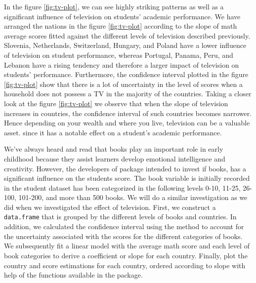 In the figure \ref{fig:tv-plot}, we can see highly striking patterns as
well as a significant influence of television on students' academic
performance. We have arranged the nations in the figure
\ref{fig:tv-plot} according to the slope of math average scores fitted
against the different levels of television described previously.
Slovenia, Netherlands, Switzerland, Hungary, and Poland have a lower
influence of television on student performance, whereas Portugal,
Panama, Peru, and Lebanon have a rising tendency and therefore a larger
impact of television on students' performance. Furthermore, the
confidence interval plotted in the figure \ref{fig:tv-plot} show that
there is a lot of uncertainty in the level of scores when a household
does not possess a TV in the majority of the countries. Taking a closer
look at the figure \ref{fig:tv-plot} we observe that when the slope of
television increases in countries, the confidence interval of such
countries becomes narrower. Hence depending on your wealth and where you
live, television can be a valuable asset. since it has a notable effect
on a student's academic performance.

We've always heard and read that books play an important role in early
childhood because they assist learners develop emotional intelligence
and creativity. However, the developers of 
package intended to invest if books, has a significant influence on the
students score. The book variable is initially recorded in the student
dataset has been categorized in the following levels 0-10, 11-25,
26-100, 101-200, and more than 500 books. We will do a similar
investigation as we did when we investigated the effect of television.
First, we construct a \texttt{data.frame} that is grouped by the
different levels of books and countries. In addition, we calculated the
confidence interval using the method to account for the uncertainty
associated with the scores for the different categories of books. We
subsequently fit a linear model with the average math score and each
level of book categories to derive a coefficient or slope for each
country. Finally, plot the country and score estimations for each
country, ordered according to slope with help of the functions available
in the  \citep{ggplot2} package.

